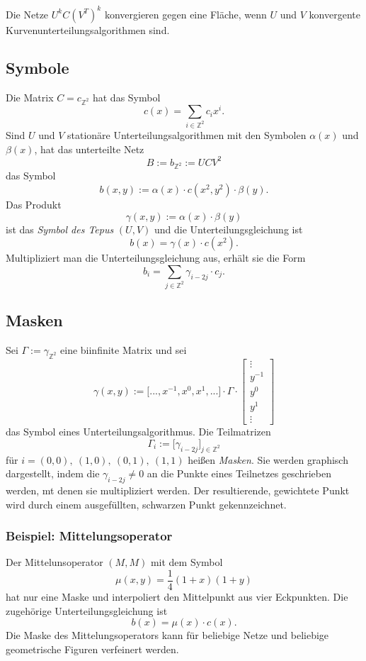Die Netze \(U^kC(V^T)^k\) konvergieren gegen eine Fläche, wenn \(U\) und \(V\) konvergente Kurvenunterteilungsalgorithmen sind.


\subsection{Symbole}
Die Matrix \(C=c_{\mathbb{Z}^2}\) hat das Symbol
\[c(x) = \sum_{i \in \mathbb{Z}^2} c_i x^i.\]
Sind \(U\) und \(V\) stationäre Unterteilungsalgorithmen mit den Symbolen \(\alpha(x)\) und \(\beta(x)\), hat das unterteilte Netz
\[B := b_{\mathbb{Z}^2} := UCV^2\]
das Symbol
\[b(x,y) := \alpha(x) \cdot c(x^2,y^2) \cdot \beta(y).\]
Das Produkt
\[\gamma(x,y) := \alpha(x) \cdot \beta(y)\]
ist das \textit{Symbol des Tepus} \((U,V)\) und die Unterteilungsgleichung ist
\[b(x) = \gamma(x) \cdot c(x^2).\]
Multipliziert man die Unterteilungsgleichung aus, erhält sie die Form
\[b_i = \sum_{j \in \mathbb{Z}^2} \gamma_{i-2j} \cdot c_j.\]


\subsection{Masken}
Sei \(\Gamma := \gamma_{\mathbb{Z}^2}\) eine biinfinite Matrix und sei
\[\gamma(x,y) := \lbrack ...,x^{-1},x^0,x^1,...\rbrack \cdot \Gamma \cdot \begin{bmatrix} \vdots \\ y^{-1} \\ y^0 \\ y^1 \\ \vdots \end{bmatrix}\]
das Symbol eines Unterteilungsalgorithmus. Die Teilmatrizen
\[\Gamma_i := \lbrack \gamma_{i-2j} \rbrack_{j \in \mathbb{Z}^2}\]
für \(i=(0,0),~(1,0),~(0,1),~(1,1)\) heißen \textit{Masken}. Sie werden graphisch dargestellt, indem die \(\gamma_{i-2j} \ne 0\) an die Punkte eines Teilnetzes geschrieben werden, mt denen sie multipliziert werden. Der resultierende, gewichtete Punkt wird durch einem ausgefüllten, schwarzen Punkt gekennzeichnet.

\subsubsection{Beispiel: Mittelungsoperator}
Der Mittelunsoperator \((M,M)\) mit dem Symbol
\[\mu(x,y)= \frac{1}{4}(1+x)(1+y)\]
hat nur eine Maske und interpoliert den Mittelpunkt aus vier Eckpunkten. Die zugehörige Unterteilungsgleichung ist
\[b(x) = \mu(x) \cdot c(x).\]
Die Maske des Mittelungsoperators kann für beliebige Netze und beliebige geometrische Figuren verfeinert werden.


